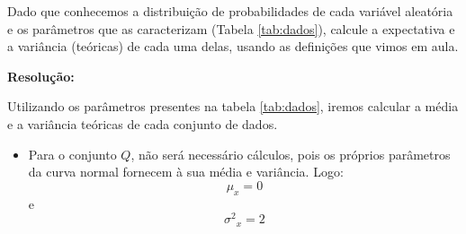 \documentclass[]{abntex2}
\begin{document}
\noindent Dado que conhecemos a distribuição de probabilidades de cada variável aleatória e os parâmetros que as caracterizam (Tabela \ref{tab:dados}), calcule a expectativa e a variância (teóricas) de cada uma delas, usando as definições que vimos em aula.

\textbf{Resolução:}

Utilizando os parâmetros presentes na tabela \ref{tab:dados}, iremos calcular a média e a variância teóricas de cada conjunto de dados.

\begin{itemize}
    \item Para o conjunto $Q$, não será necessário cálculos, pois os próprios parâmetros da curva normal fornecem à sua média e variância. Logo:
    \[
    \mu_x = 0
    \]
    e
    \[
    {\sigma^2}_x = 2
    \]
\end{itemize}

\postextual


\end{document}
